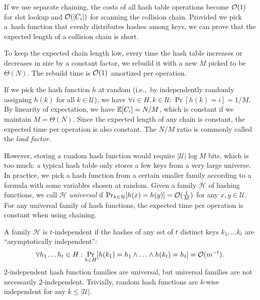 If we use separate chaining, the costs of all hash table operations become
$\mathcal{O}(1)$ for slot lookup and $\mathcal{O}(|C_i|)$ for scanning the collision chain.
Provided we pick a~hash function that evenly distributes hashes among keys,
we can prove that the expected length of a collision chain is short.

To keep the expected chain length low, every time the hash table increases
or decreases in size by a constant factor, we rebuild it with a new $M$
picked to be $\Theta(N)$. The rebuild time is $\mathcal{O}(1)$ amortized per operation.

If we pick the hash function $h$ at random (i.e.,\ by independently randomly
assigning $h(k)$ for all $k\in\mathcal{U}$), we have $\forall i\in H,
k\in\mathcal{U}: \Pr[h(k)=i]=1/M$.
By linearity of expectation, we have $\mathbb{E}[C_i]=N/M$, which is
constant if we maintain $M=\Theta(N)$. Since the expected length of any chain
is constant, the expected time per operation is also constant.
The $N/M$ ratio is commonly called the \emph{load factor}.

However, storing a random hash function would require $|\mathcal{U}|\log M$
bits, which is too much: a typical hash table only stores a few keys from a
very large universe.
In practice, we pick a hash function from a certain smaller family according to
a formula with some variables chosen at random.
Given a family $\mathcal{H}$ of hashing functions, we call $\mathcal{H}$
\emph{universal} if $\Pr_{h\in \mathcal{H}}[h(x)=h(y)]=\mathcal{O}(\frac{1}{M})$ for any
$x, y\in\mathcal{U}$.
For any universal family of hash functions, the expected time per operation
is constant when using chaining.

A family $\mathcal{H}$ is $t$-independent if the hashes of any set of $t$
distinct keys $k_1,\ldots k_t$ are ``asymptotically independent'':
$$\forall h_1\ldots h_t\in H: \Pr_{h\in H}[h(k_1)=h_1\wedge \ldots \wedge
	h(k_t)=h_t]=\mathcal{O}(m^{-t}).$$
2-independent hash function families are universal, but universal families
are not necessarily 2-independent.
Trivially, random hash functions are $k$-wise independent for any
$k\leq|\mathcal{U}|$.


